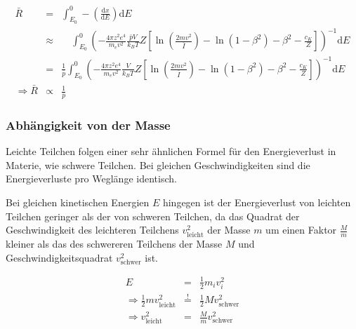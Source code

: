 \documentclass[12pt,a4paper]{scrartcl}
\numberwithin{equation}{section} %
\renewcommand{\[}{} %
\renewcommand{\]}{\noindent} %
\begin{document}
\[
\begin{eqnarray}
    \bar{R} &=&
        \int_{E_0}^{0} -\left(\frac{\mathrm dx}{\mathrm dE}\right) \mathrm dE \\
        &\approx&
            \quad
            \int_{E_0}^{0}
                \left(
                - \frac{4\pi z^2 e^4}{m_e v^2}
                \frac{\bar pV}{k_BT}
                Z\left[
                    \ln\left(\frac{2mv^2}{\bar I}\right)
                    - \ln\left(1 - \beta^2\right)
                    - \beta^2
                    - \frac{c_K}{Z}
                \right]
            \right)^{-1}
            \mathrm dE \\
        &=&
            \frac{1}{\bar p}
            \int_{E_0}^{0}
                \left(
                - \frac{4\pi z^2 e^4}{m_e v^2}
                \frac{V}{k_BT}
                Z\left[
                    \ln\left(\frac{2mv^2}{\bar I}\right)
                    - \ln\left(1 - \beta^2\right)
                    - \beta^2
                    - \frac{c_K}{Z}
                \right]
            \right)^{-1}
            \mathrm dE \\
    \Rightarrow \bar R &\propto& \frac{1}{\bar p} \label{R(p)}
\end{eqnarray}
\]

\hypertarget{abhuxe4ngigkeit-von-der-masse}{%
\subsubsection{Abhängigkeit von der
Masse}\label{abhuxe4ngigkeit-von-der-masse}}

Leichte Teilchen folgen einer sehr ähnlichen Formel für den
Energieverlust in Materie, wie schwere Teilchen. Bei gleichen
Geschwindigkeiten sind die Energieverluste pro Weglänge identisch.

Bei gleichen kinetischen Energien \(E\) hingegen ist der Energieverlust
von leichten Teilchen geringer als der von schweren Teilchen, da das
Quadrat der Geschwindigkeit des leichteren Teilchens
\(v_\mathrm{leicht}^2\) der Masse \(m\) um einen Faktor \(\frac{M}{m}\)
kleiner als das des schwereren Teilchens der Masse \(M\) und
Geschwindigkeitsquadrat \(v_\mathrm{schwer}^2\) ist.

\[
\begin{eqnarray}
    E &=& \frac{1}{2}m_i v_i^2 \\
    \Rightarrow \frac{1}{2} m v_\mathrm{leicht}^2
        &\overset{!}{=}& \frac{1}{2} M v_\mathrm{schwer}^2 \\
    \Rightarrow v_\mathrm{leicht}^2 & = &\frac{M}{m} v_\mathrm{schwer}^2
\end{eqnarray}
\]
\end{document}
